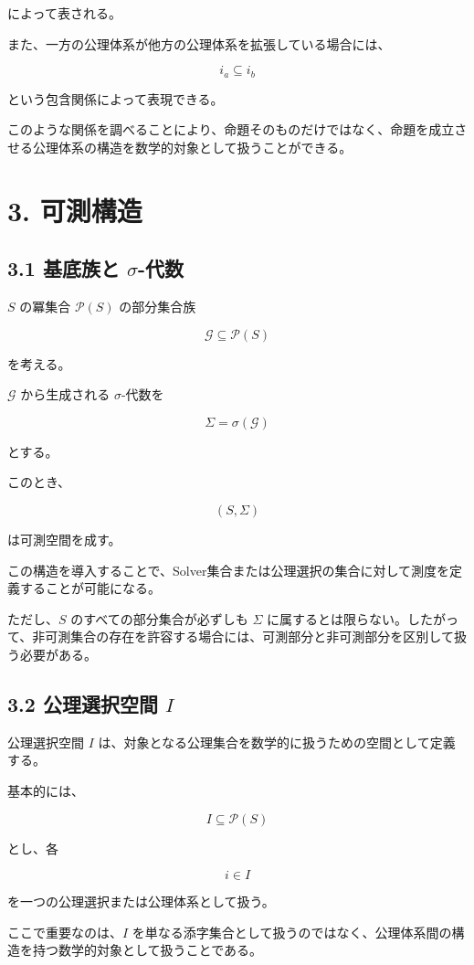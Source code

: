 \documentclass[12pt,a4paper]{article}
\begin{document}
によって表される。

また、一方の公理体系が他方の公理体系を拡張している場合には、

\[
i_a\subseteq i_b
\]

という包含関係によって表現できる。

このような関係を調べることにより、命題そのものだけではなく、命題を成立させる公理体系の構造を数学的対象として扱うことができる。

\section{3. 可測構造}

\subsection{3.1 基底族と $\sigma$-代数}

$S$ の冪集合 $\mathcal{P}(S)$ の部分集合族

\[
\mathcal{G}\subseteq\mathcal{P}(S)
\]

を考える。

$\mathcal{G}$ から生成される $\sigma$-代数を

\[
\Sigma=\sigma(\mathcal{G})
\]

とする。

このとき、

\[
(S,\Sigma)
\]

は可測空間を成す。

この構造を導入することで、Solver集合または公理選択の集合に対して測度を定義することが可能になる。

ただし、$S$ のすべての部分集合が必ずしも $\Sigma$ に属するとは限らない。したがって、非可測集合の存在を許容する場合には、可測部分と非可測部分を区別して扱う必要がある。

\subsection{3.2 公理選択空間 $I$}

公理選択空間 $I$ は、対象となる公理集合を数学的に扱うための空間として定義する。

基本的には、

\[
I\subseteq\mathcal{P}(S)
\]

とし、各

\[
i\in I
\]

を一つの公理選択または公理体系として扱う。

ここで重要なのは、$I$ を単なる添字集合として扱うのではなく、公理体系間の構造を持つ数学的対象として扱うことである。
\end{document}
